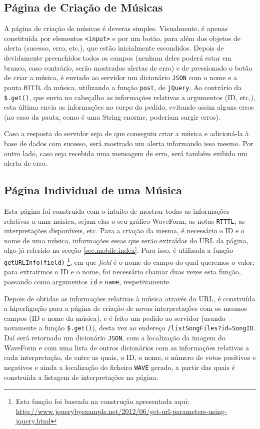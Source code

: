 \documentclass[a4paper,11pt,openright,oneside]{report}
\begin{document}
\subsection{Página de Criação de Músicas}
\label{sec.mobile.createsong}

A página de criação de músicas é deveras simples. Visualmente, é apenas constituída por elementos \texttt{<input>} e por um botão, para além dos objetos de alerta (sucesso, erro, etc.), que estão inicialmente escondidos. Depois de devidamente preenchidos todos os campos (nenhum deles poderá estar em branco, caso contrário, serão mostrados alertas de erro) e de pressionado o botão de criar a música, é enviado ao servidor um dicionário \verb|JSON| com o nome e a pauta \verb|RTTTL| da música, utilizando a função \texttt{post}, de \verb|jQuery|. Ao contrário da \texttt{\$.get()}, que envia no cabeçalho as informações relativas a argumentos (ID, etc,), esta última envia as informações no corpo do pedido, evitando assim alguns erros (no caso da pauta, como é uma String enorme, poderiam surgir erros).

Caso a resposta do servidor seja de que conseguiu criar a música e adicioná-la à base de dados com sucesso, será mostrado um alerta informando isso mesmo. Por outro lado, caso seja recebida uma mensagem de erro, será também exibido um alerta de erro.

\subsection{Página Individual de uma Música}
\label{sec.mobile.songpage}

Esta página foi construída com o intuito de mostrar todas as informações relativas a uma música, sejam elas o seu gráfico WaveForm, as notas \verb|RTTTL|, as interpretações disponíveis, etc. Para a criação da mesma, é necessário o ID e o nome de uma música, informações essas que serão extraídas do URL da página, algo já referido na secção \autoref{sec.mobile.index}. Para isso, é utilizada a função \texttt{getURLInfo(field)} \footnote{Esta função foi baseada na construção apresentada aqui: \url{http://www.jquerybyexample.net/2012/06/get-url-parameters-using-jquery.html}}, em que \textit{field} é o nome do campo do qual queremos o valor; para extrairmos o ID e o nome, foi necessário chamar duas vezes esta função, passando como argumentos \texttt{id} e \texttt{name}, respetivamente.

Depois de obtidas as informações relativas à música através do URL, é construída a hiperligação para a página de criação de novas interpretações com os mesmos campos (ID e nome da música), e é feito um pedido ao servidor (usando novamente a função \texttt{\$.get()}), desta vez ao endereço \texttt{/listSongFiles?id=SongID}. Daí será retornado um dicionário \verb|JSON|, com a localização da imagem do WaveForm e com uma lista de outros dicionários com as informações relativas a cada interpretação, de entre as quais, o ID, o nome, o número de votos positivos e negativos e ainda a localização do ficheiro \verb|WAVE| gerado, a partir das quais é construída a listagem de interpretações na página.
\end{document}
